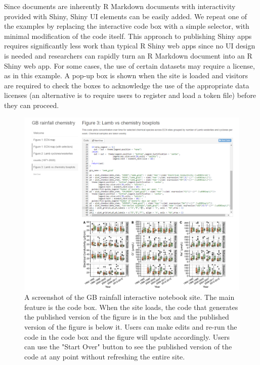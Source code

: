Since  documents are inherently R Markdown documents
with interactivity provided with Shiny, Shiny UI elements can be easily
added. We repeat one of the examples by replacing the interactive code
box with a simple selector, with minimal modification of the code
itself. This approach to publishing Shiny apps requires significantly
less work than typical R Shiny web apps since no UI design is needed and
researchers can rapidly turn an R Markdown document into an R Shiny web
app. For some cases, the use of certain datasets may require a license,
as in this example. A pop-up box is shown when the site is loaded and
visitors are required to check the boxes to acknowledge the use of the
appropriate data licenses (an alternative is to require users to
register and load a token file) before they can proceed.

\begin{Schunk}
\begin{figure}
\includegraphics[width=\textwidth]{GB_notebook_screenshot} \caption[A screenshot of the GB rainfall interactive notebook site]{A screenshot of the GB rainfall interactive notebook site. The main feature is the code box. When the site loads, the code that generates the published version of the figure is in the box and the published version of the figure is below it. Users can make edits and re-run the code in the code box and the figure will update accordingly. Users can use the "Start Over" button to see the published version of the code at any point without refreshing the entire site.}\label{fig:fig2}
\end{figure}
\end{Schunk}

